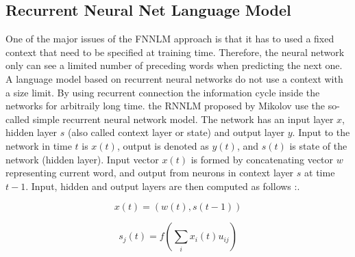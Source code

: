 


\subsection{Recurrent Neural Net Language Model}

One of the major issues of the \ac{FNNLM}  approach is that
it has to used a fixed context that need to be specified at training time.
Therefore, the neural network only can see a limited number of preceding words when
predicting the next one.  A language model based on recurrent neural networks  do not use a context
with a size limit.  By using recurrent connection the information cycle
inside the networks for arbitraily long time. the \ac{RNNLM} proposed by
Mikolov use the so-called simple
recurrent neural network model. The network has an input layer $x$, hidden
layer $s$ (also called context layer or state) and output layer $y$. Input to
the network in time $t$ is $x(t)$, output is denoted as $y(t)$, and $s(t)$ is
state of the network (hidden layer). Input vector $x(t)$ is formed by
concatenating vector $w$ representing current word, and output from neurons in
context layer $s$ at time $t - 1$. Input, hidden and output layers are then
computed as follows \cite{conf/interspeech/MikolovKBCK10}:.

\begin{equation} x(t) = (w(t), s(t-1))  \end{equation} 

\begin{equation} s_j(t) = f \left( \sum_{i}{x_i(t)u_{ij}}
  \right)   \end{equation}


